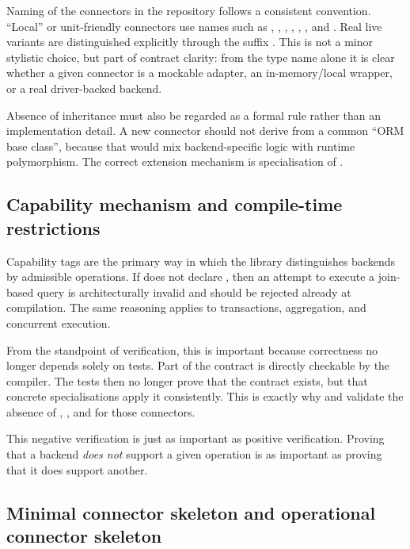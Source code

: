 Naming of the connectors in the repository follows a consistent convention. ``Local'' or unit-friendly connectors use names such as , , , , , , and . Real live variants are distinguished explicitly through the suffix . This is not a minor stylistic choice, but part of contract clarity: from the type name alone it is clear whether a given connector is a mockable adapter, an in-memory/local wrapper, or a real driver-backed backend.

Absence of inheritance must also be regarded as a formal rule rather than an implementation detail. A new connector should not derive from a common ``ORM base class'', because that would mix backend-specific logic with runtime polymorphism. The correct extension mechanism is specialisation of .

\subsection{Capability mechanism and compile-time restrictions}

Capability tags are the primary way in which the library distinguishes backends by admissible operations. If  does not declare , then an attempt to execute a join-based query is architecturally invalid and should be rejected already at compilation. The same reasoning applies to transactions, aggregation, and concurrent execution.

From the standpoint of verification, this is important because correctness no longer depends solely on tests. Part of the contract is directly checkable by the compiler. The tests then no longer prove that the contract exists, but that concrete specialisations apply it consistently. This is exactly why  and  validate the absence of , , and  for those connectors.

This negative verification is just as important as positive verification. Proving that a backend \emph{does not} support a given operation is as important as proving that it does support another.

\subsection{Minimal connector skeleton and operational connector skeleton}

